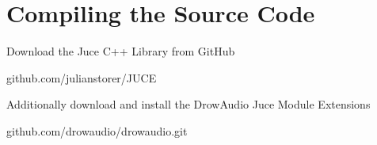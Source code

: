 \section{Compiling the Source Code}

Download the Juce C++ Library from GitHub

github.com/julianstorer/JUCE

Additionally download and install the DrowAudio Juce Module Extensions

github.com/drowaudio/drowaudio.git